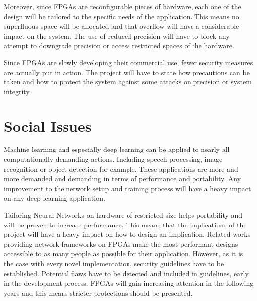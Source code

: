 Moreover, since FPGAs are reconfigurable pieces of hardware, each one of the design will be tailored to the specific needs of the application. This means no superfluous space will be allocated and that overflow will have a considerable impact on the system. The use of reduced precision will have to block any attempt to downgrade precision or access restricted spaces of the hardware.

Since FPGAs are slowly developing their commercial use, fewer security measures are actually put in action. The project will have to state how precautions can be taken and how to protect the system against some attacks on precision or system integrity.


\section{Social Issues}

Machine learning and especially deep learning can be applied to nearly all computationally-demanding actions. Including speech processing, image recognition or object detection for example. These applications are more and more demanded and demanding in terms of performance and portability. Any improvement to the network setup and training process will have a heavy impact on any deep learning application.

Tailoring Neural Networks on hardware of restricted size helps portability and will be proven to increase performance. This means that the implications of the project will have a heavy impact on how to design an implication. Related works providing network frameworks on FPGAs \cite{Zhao2016, Colangelo2018, Jahanshahi2019} make the most performant designs accessible to as many people as possible for their application. However, as it is the case with every novel implementation, security guidelines have to be established. Potential flaws have to be detected and included in guidelines, early in the development process. FPGAs will gain increasing attention in the following years and this means stricter protections should be presented.
